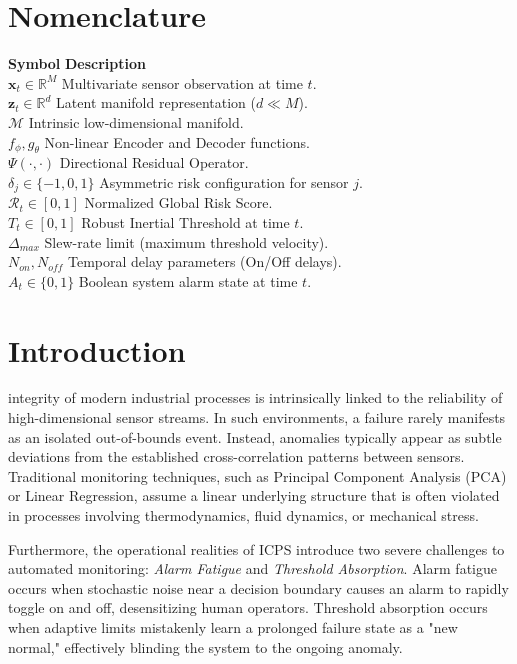 \documentclass[journal]{IEEEtran}
\begin{document}
	\section{Nomenclature}
	\begin{tabbing}
		\textbf{Symbol} \hspace{3em} \= \textbf{Description} \\
		$\mathbf{x}_t \in \mathbb{R}^M$ \> Multivariate sensor observation at time $t$. \\
		$\mathbf{z}_t \in \mathbb{R}^d$ \> Latent manifold representation ($d \ll M$). \\
		$\mathcal{M}$ \> Intrinsic low-dimensional manifold. \\
		$f_\phi, g_\theta$ \> Non-linear Encoder and Decoder functions. \\
		$\Psi(\cdot, \cdot)$ \> Directional Residual Operator. \\
		$\delta_j \in \{-1,0,1\}$ \> Asymmetric risk configuration for sensor $j$. \\
		$\mathcal{R}_t \in [0,1]$ \> Normalized Global Risk Score. \\
		$T_t \in [0,1]$ \> Robust Inertial Threshold at time $t$. \\
		$\Delta_{max}$ \> Slew-rate limit (maximum threshold velocity). \\
		$N_{on}, N_{off}$ \> Temporal delay parameters (On/Off delays). \\
		$A_t \in \{0,1\}$ \> Boolean system alarm state at time $t$.
	\end{tabbing}
	
	\section{Introduction}
	 integrity of modern industrial processes is intrinsically linked to the reliability of high-dimensional sensor streams. In such environments, a failure rarely manifests as an isolated out-of-bounds event. Instead, anomalies typically appear as subtle deviations from the established cross-correlation patterns between sensors. Traditional monitoring techniques, such as Principal Component Analysis (PCA) or Linear Regression, assume a linear underlying structure that is often violated in processes involving thermodynamics, fluid dynamics, or mechanical stress.
	
	Furthermore, the operational realities of ICPS introduce two severe challenges to automated monitoring: \textit{Alarm Fatigue} and \textit{Threshold Absorption}. Alarm fatigue occurs when stochastic noise near a decision boundary causes an alarm to rapidly toggle on and off, desensitizing human operators. Threshold absorption occurs when adaptive limits mistakenly learn a prolonged failure state as a "new normal," effectively blinding the system to the ongoing anomaly.
	
\end{document}
